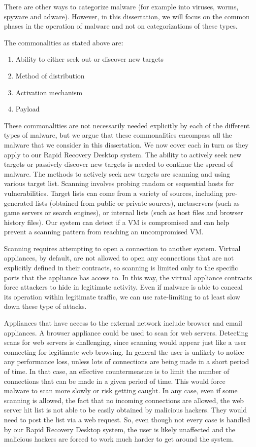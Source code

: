 There are other ways to categorize malware (for example into viruses, worms, spyware and adware). However, in this dissertation, we will focus on the common phases in the operation of malware and not on categorizations of these types.

The commonalities as stated above are:

\begin{enumerate}
\item{Ability to either seek out or discover new targets}
\item{Method of distribution}
\item{Activation mechanism}
\item{Payload}
\end{enumerate}

These commonalities are not necessarily needed explicitly by each of the different types of malware, but we argue that these commonalities encompass all the malware that we consider in this dissertation. We now cover each in turn as they apply to our Rapid Recovery Desktop system. The ability to actively seek new targets or passively discover new targets is needed to continue the spread of malware. The methods to actively seek new targets are scanning and using various target list. Scanning involves probing random or sequential hosts for vulnerabilities. Target lists can come from a variety of sources, including pre-generated lists (obtained from public or private sources), metaservers (such as game servers or search engines), or internal lists (such as host files and browser history files). Our system can detect if a VM is compromised and can help prevent a scanning pattern from reaching an uncompromised VM.

Scanning requires attempting to open a connection to another system. Virtual appliances, by default, are not allowed to open any connections that are not explicitly defined in their contracts, so scanning is limited only to the specific ports that the appliance has access to. In this way, the virtual appliance contracts force attackers to hide in legitimate activity. Even if malware is able to conceal its operation within legitimate traffic, we can use rate-limiting to at least slow down these type of attacks.

Appliances that have access to the external network include browser and email appliances. A browser appliance could be used to scan for web servers. Detecting scans for web servers is challenging, since scanning would appear just like a user connecting for legitimate web browsing. In general the user is unlikely to notice any performance loss, unless lots of connections are being made in a short period of time. In that case, an effective countermeasure is to limit the number of connections that can be made in a given period of time. This would force malware to scan more slowly or risk getting caught. In any case, even if some scanning is allowed, the fact that no incoming connections are allowed, the web server hit list is not able to be easily obtained by malicious hackers. They would need to post the list via a web request. So, even though not every case is handled by our Rapid Recovery Desktop system, the user is likely unaffected and the malicious hackers are forced to work much harder to get around the system. 

